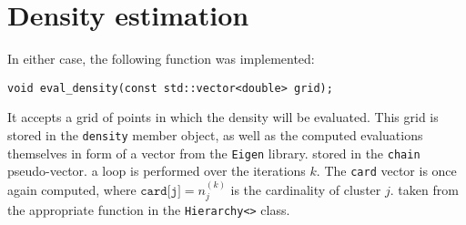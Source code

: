 \section{Density estimation} \label{dens-estim}
In either case, the following function was implemented:
\begin{verbatim}
void eval_density(const std::vector<double> grid);
\end{verbatim}
It accepts a grid of points in which the density will be evaluated.
This grid is stored in the \verb|density| member object, as well as the computed evaluations themselves in form of a vector from the \verb|Eigen| library.
stored in the \verb|chain| pseudo-vector.
a loop is performed over the iterations $k$.
The \verb|card| vector is once again computed, where $\texttt{card[j]} = n^{(k)}_j$ is the cardinality of cluster $j$.
taken from the appropriate function in the \verb|Hierarchy<>| class.
